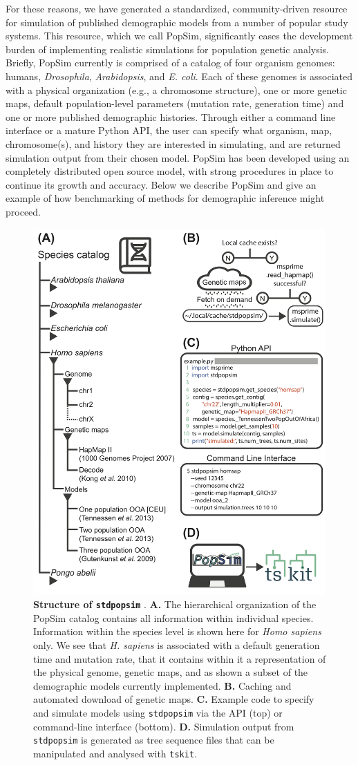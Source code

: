 \documentclass[12pt,halfline,a4paper]{ouparticle}
\newcommand{\stdpopsim}{\texttt{stdpopsim} }
\begin{document}
For these reasons, we have generated a standardized, community-driven resource
for simulation of published demographic models from a number of popular study systems.
This resource, which we call PopSim, significantly eases the development
burden of implementing realistic simulations for population genetic analysis.
Briefly, PopSim currently is comprised of a catalog of four organism genomes: humans,
\emph{Drosophila}, \emph{Arabidopsis}, and \emph{E. coli}. Each of these
genomes is associated with a physical organization (e.g., a chromosome structure),
one or more genetic maps, default population-level parameters (mutation rate,
generation time) and one or more published demographic histories. Through
either a command line interface or a mature Python API, the user can specify what
organism, map, chromosome(s), and history they are interested in simulating, and are returned
simulation output from their chosen model. PopSim has been developed using an
completely distributed open source model, with strong procedures in place
to continue its growth and accuracy. Below we describe PopSim and give an
example of how benchmarking of methods for demographic inference might proceed.



\begin{figure}[t]
\begin{center}
\includegraphics[width=0.5\linewidth]{display_items/Figure1.png}
\caption{\textbf{Structure of \stdpopsim}. \textbf{A.} The
hierarchical organization of the PopSim catalog contains all information
within individual species. Information within the species level is shown here
for \emph{Homo sapiens} only. We see that \emph{H. sapiens} is associated
with a default generation time and mutation rate, that it contains within
it a representation of the physical genome, genetic maps, and as shown a
subset of the demographic models currently implemented. \textbf{B.} Caching
and automated download of genetic maps. \textbf{C.} Example code to specify
and simulate models using \stdpopsim via the API (top) or
command-line interface (bottom). \textbf{D.} Simulation output from
\stdpopsim is generated as tree sequence files that can
be manipulated and analysed with \texttt{tskit}.}
\label{fig:cartoon}
\end{center}
\end{figure}
\end{document}

